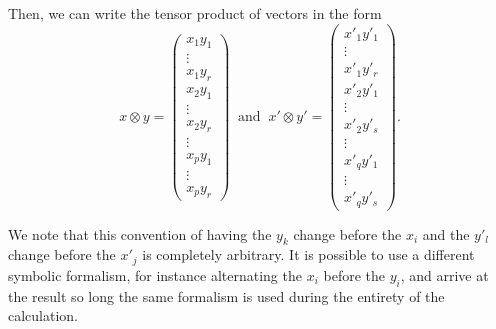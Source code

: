 \documentclass{report}
\theoremstyle{definition}
\theoremstyle{remark}
\begin{document}
    
    Then, we can write the tensor product of vectors in the form 
    \begin{equation*}
        x \otimes y = 
        \begin{pmatrix}
        x_1 y_1 \\
        \vdots \\
        x_1 y_r \\
        x_2 y_1 \\
        \vdots \\
        x_2 y_r \\
        \vdots \\
        x_p y_1 \\
        \vdots \\
        x_p y_r 
        \end{pmatrix}\;\;\text{and}\;\;
        x' \otimes y' = \begin{pmatrix}
        x'_1 y'_1 \\
        \vdots \\
        x'_1 y'_r \\
        x'_2 y'_1 \\
        \vdots \\
        x'_2 y'_s \\
        \vdots \\
        x'_q y'_1 \\
        \vdots \\
        x'_q y'_s
        \end{pmatrix}.
    \end{equation*}
    
    We note that this convention of having the $y_k$ change before the $x_i$ and the $y'_l$ change before the $x'_j$  is completely arbitrary. It is possible to use a different symbolic formalism, for instance alternating the $x_i$ before the $y_i$, and arrive at the result so long the same formalism is used during the entirety of the calculation. 
    
\end{document}
